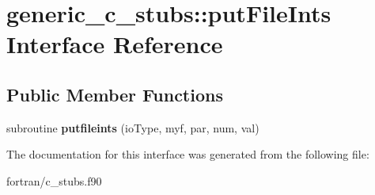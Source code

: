 \hypertarget{interfacegeneric__c__stubs_1_1put_file_ints}{}\section{generic\+\_\+c\+\_\+stubs\+:\+:put\+File\+Ints Interface Reference}
\label{interfacegeneric__c__stubs_1_1put_file_ints}
\subsection*{Public Member Functions}
\begin{DoxyCompactItemize}
\item 
\mbox{\label{interfacegeneric__c__stubs_1_1put_file_ints_a91bcb83f94f95a6e5ebf70291f06bc4e}} 
subroutine {\bfseries putfileints} (io\+Type, myf, par, num, val)
\end{DoxyCompactItemize}


The documentation for this interface was generated from the following file\+:\begin{DoxyCompactItemize}
\item 
fortran/c\+\_\+stubs.\+f90\end{DoxyCompactItemize}
